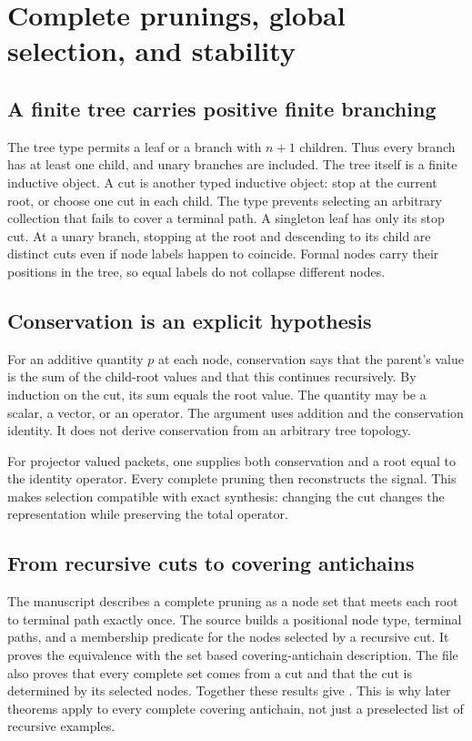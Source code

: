 \section{Complete prunings, global selection, and stability}
\subsection{A finite tree carries positive finite branching}
The tree type permits a leaf or a branch with $n+1$ children. Thus every branch has at least one child, and unary branches are included.
The tree itself is a finite inductive object. A cut is another typed inductive object: stop at the current root, or choose one cut in each child. The type prevents selecting an arbitrary collection that fails to cover a terminal path.
A singleton leaf has only its stop cut. At a unary branch, stopping at the root and descending to its child are distinct cuts even if node labels happen to coincide. Formal nodes carry their positions in the tree, so equal labels do not collapse different nodes.

\subsection{Conservation is an explicit hypothesis}
For an additive quantity $p$ at each node, conservation says that the parent's value is the sum of the child-root values and that this continues recursively.
By induction on the cut, its sum equals the root value. The quantity may be a scalar, a vector, or an operator. The argument uses addition and the conservation identity. It does not derive conservation from an arbitrary tree topology.

For projector valued packets, one supplies both conservation and a root equal to the identity operator. Every complete pruning then reconstructs the signal. This makes selection compatible with exact synthesis: changing the cut changes the representation while preserving the total operator.

\subsection{From recursive cuts to covering antichains}
The manuscript describes a complete pruning as a node set that meets each root to terminal path exactly once. The source builds a positional node type, terminal paths, and a membership predicate for the nodes selected by a recursive cut. It proves the equivalence with the set based covering-antichain description.
The file also proves that every complete set comes from a cut and that the cut is determined by its selected nodes. Together these results give . This is why later theorems apply to every complete covering antichain, not just a preselected list of recursive examples.

